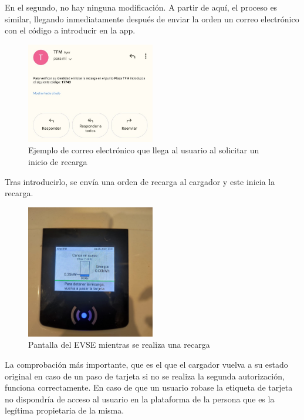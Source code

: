 \documentclass[12pt,a4paper,onecolumn,oneside]{report}
\begin{document}
En el segundo, no hay ninguna modificación. A partir de aquí, el proceso es similar, llegando inmediatamente después de enviar la orden un correo electrónico con el código a introducir en la app.


\begin{figure}[H] 
\centering
  \includegraphics[width=0.5\textwidth]{figuras/prueba3.png}
  \caption[Ejemplo de correo electrónico que llega al usuario al solicitar un inicio de recarga]{Ejemplo de correo electrónico que llega al usuario al solicitar un inicio de recarga\\
  }
  \label{fig:prueba3}
\end{figure}

Tras introducirlo, se envía una orden de recarga al cargador y este inicia la recarga.

\begin{figure}[H] 
\centering
  \includegraphics[width=0.5\textwidth]{figuras/prueba4.png}
  \caption[Pantalla del EVSE mientras se realiza una recarga]{Pantalla del EVSE mientras se realiza una recarga\\
  }
  \label{fig:prueba4}
\end{figure}

La comprobación más importante, que es el que el cargador vuelva a su estado original en caso de un paso de tarjeta si no se realiza la segunda autorización, funciona correctamente. En caso de que un usuario robase la etiqueta de tarjeta no dispondría de acceso al usuario en la plataforma de la persona que es la legítima propietaria de la misma.
\end{document}
